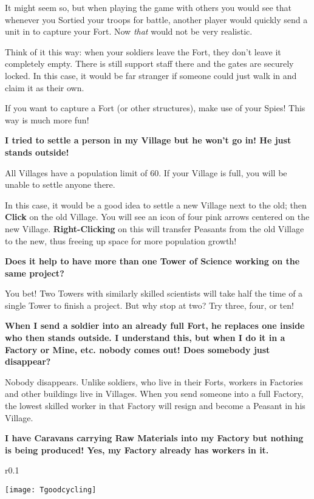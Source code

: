 It might seem so, but when playing the game with others you would see that whenever you Sortied your troops for battle, another player would quickly send a unit in to capture your Fort. Now \textit{that} would not be very realistic.

Think of it this way: when your soldiers leave the Fort, they don’t leave it completely empty. There is still support staff there and the gates are securely locked. In this case, it would be far stranger if someone could just walk in and claim it as their own.

If you want to capture a Fort (or other structures), make use of your Spies! This way is much more fun!

{\large \textbf{\textsf{I tried to settle a person in my Village but he won’t go in! He just stands outside!}}}

All Villages have a population limit of 60. If your Village is full, you will be unable to settle anyone there.

In this case, it would be a good idea to settle a new Village next to the old; then \textbf{Click} on the old Village. You will see an icon of four pink arrows centered on the new Village. \textbf{Right-Clicking} on this will transfer Peasants from the old Village to the new, thus freeing up space for more population growth!

{\large \textbf{\textsf{Does it help to have more than one Tower of Science working on the same project}?}}

You bet! Two Towers with similarly skilled scientists will take half the time of a single Tower to finish a project. But why stop at two? Try three, four, or ten!

{\large \textbf{\textsf{When I send a soldier into an already full Fort, he replaces one inside who then stands outside. I understand this, but when I do it in a Factory or Mine, etc. nobody comes out! Does somebody just disappear?}}}

Nobody disappears. Unlike soldiers, who live in their Forts, workers in Factories and other buildings live in Villages. When you send someone into a full Factory, the lowest skilled worker in that Factory will resign and become a Peasant in his Village.

{\large \textbf{\textsf{I have Caravans carrying Raw Materials into my Factory but nothing is being produced! Yes, my Factory already has workers in it.}}}

\begin{wrapfigure}{r}{0.1\textwidth}
    \vspace{-20pt}
    \begin{center}
        \texttt{[image: Tgoodcycling]}
    \end{center}
    \vspace{-20pt}
\end{wrapfigure}

